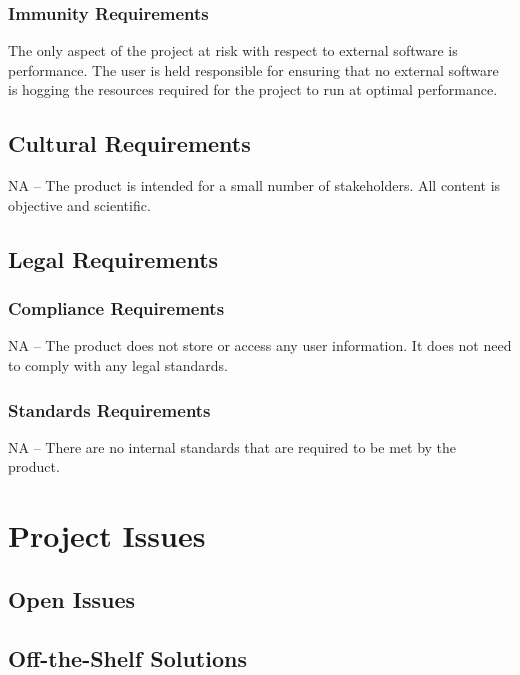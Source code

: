 \documentclass[12pt]{article}
\begin{document}
\subsubsection{Immunity Requirements}
The only aspect of the project at risk with respect to external software is performance. The user is held responsible for ensuring that no external software is hogging the resources required for the project to run at optimal performance.


\subsection{Cultural Requirements} %
NA -- The product is intended for a small number of stakeholders. All content is objective and scientific.

\subsection{Legal Requirements} %
\subsubsection{Compliance Requirements}
NA -- The product does not store or access any user information. It does not need to comply with any legal standards.

\subsubsection{Standards Requirements}
NA -- There are no internal standards that are required to be met by the product.

\section{Project Issues}

\subsection{Open Issues} %

\subsection{Off-the-Shelf Solutions} %
\end{document}

